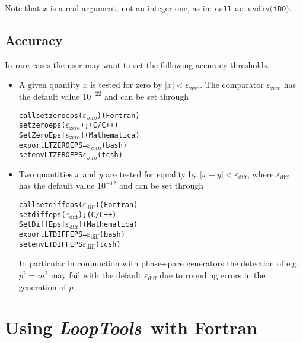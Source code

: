 \documentclass[twoside,12pt]{report}
\def\LT{\textit{LoopTools}}
\def\eg{e.g.\ }
\def\zeroeps{\ensuremath{\varepsilon_{\mathrm{zero}}}}
\def\diffeps{\ensuremath{\varepsilon_{\mathrm{diff}}}}
\def\Code#1{\ensuremath{\texttt{#1}}}
\begin{document}
Note that $x$ is a real argument, not an integer one, as in:
\Code{call setuvdiv(1D0)}.


\subsection{Accuracy}

In rare cases the user may want to set the following accuracy thresholds.
\begin{itemize}
\item A given quantity $x$ is tested for zero by $|x| < \zeroeps$.  The 
comparator $\zeroeps$ has the default value $10^{-22}$ and can be set 
through

\begin{alltt}
   call setzeroeps(\(\zeroeps\))                    (Fortran)
   setzeroeps(\(\zeroeps\));                        (C/C++)
   SetZeroEps[\(\zeroeps\)]                         (Mathematica)
   export LTZEROEPS=\(\zeroeps\)                    (bash)
   setenv LTZEROEPS \(\zeroeps\)                    (tcsh)
\end{alltt}

\item Two quantities $x$ and $y$ are tested for equality by
$|x - y| < \diffeps$, where $\diffeps$ has the default value $10^{-12}$ 
and can be set through

\begin{alltt}
   call setdiffeps(\(\diffeps\))                    (Fortran)
   setdiffeps(\(\diffeps\));                        (C/C++)
   SetDiffEps[\(\diffeps\)]                         (Mathematica)
   export LTDIFFEPS=\(\diffeps\)                    (bash)
   setenv LTDIFFEPS \(\diffeps\)                    (tcsh)
\end{alltt}

In particular in conjunction with phase-space generators the detection 
of \eg $p^2 = m^2$ may fail with the default $\diffeps$ due to rounding 
errors in the generation of $p$.

\end{itemize}


\section{Using \LT\ with Fortran}
\label{sect:fortran}
\end{document}
